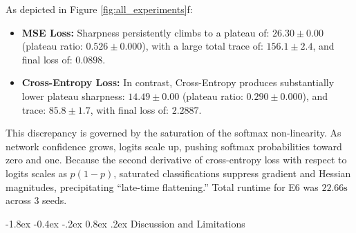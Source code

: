 \documentclass[10pt,twocolumn]{article}
\makeatletter
\renewcommand\section{\@startsection {section}{1}{\z@}%
                                   {-1.8ex \@plus -0.4ex \@minus -.2ex}%
                                   {0.8ex \@plus .2ex}%
                                   {\normalfont\large\bfseries}}
\makeatother
\begin{document}
As depicted in Figure \ref{fig:all_experiments}f:
\begin{itemize}
    \item \textbf{MSE Loss:} Sharpness persistently climbs to a plateau of:
    $26.30 \pm 0.00$
    (plateau ratio:
    $0.526 \pm 0.000$),
    with a large total trace of:
    $156.1 \pm 2.4$,
    and final loss of:
    $0.0898$.
    \item \textbf{Cross-Entropy Loss:} In contrast, Cross-Entropy produces substantially lower plateau sharpness:
    $14.49 \pm 0.00$
    (plateau ratio:
    $0.290 \pm 0.000$),
    and trace:
    $85.8 \pm 1.7$,
    with final loss of:
    $2.2887$.
\end{itemize}
This discrepancy is governed by the saturation of the softmax non-linearity. As network confidence grows, logits scale up, pushing softmax probabilities toward zero and one. Because the second derivative of cross-entropy loss with respect to logits scales as $p(1-p)$, saturated classifications suppress gradient and Hessian magnitudes, precipitating ``late-time flattening.'' Total runtime for E6 was $22.66\text{s}$ %
across 3 seeds.

\section{Discussion and Limitations}
\end{document}
